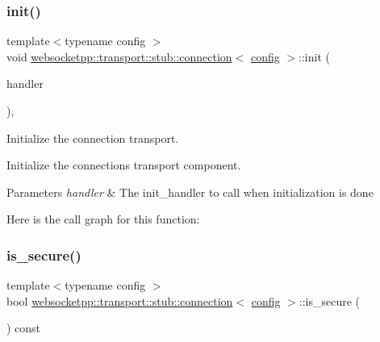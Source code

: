 \subsubsection{\texorpdfstring{init()}{init()}}
{\footnotesize\ttfamily template$<$typename config $>$ \\
void \mbox{\hyperlink{classwebsocketpp_1_1transport_1_1stub_1_1connection}{websocketpp\+::transport\+::stub\+::connection}}$<$ \mbox{\hyperlink{classconfig}{config}} $>$\+::init (\begin{DoxyParamCaption}\item[{\mbox{\hyperlink{namespacewebsocketpp_1_1transport_aeae75e675c1a334b3b33ab7120b480a5}{init\+\_\+handler}}}]{handler }\end{DoxyParamCaption})\hspace{0.3cm}{\ttfamily [inline]}, {\ttfamily [protected]}}



Initialize the connection transport. 

Initialize the connection\textquotesingle{}s transport component.


\begin{DoxyParams}{Parameters}
{\em handler} & The {\ttfamily init\+\_\+handler} to call when initialization is done \\
\hline
\end{DoxyParams}
Here is the call graph for this function\+:
\mbox{\label{classwebsocketpp_1_1transport_1_1stub_1_1connection_ab3cc0e613fc79838003c681d55ffa746}} 
\subsubsection{\texorpdfstring{is\+\_\+secure()}{is\_secure()}}
{\footnotesize\ttfamily template$<$typename config $>$ \\
bool \mbox{\hyperlink{classwebsocketpp_1_1transport_1_1stub_1_1connection}{websocketpp\+::transport\+::stub\+::connection}}$<$ \mbox{\hyperlink{classconfig}{config}} $>$\+::is\+\_\+secure (\begin{DoxyParamCaption}{ }\end{DoxyParamCaption}) const\hspace{0.3cm}{\ttfamily [inline]}}



